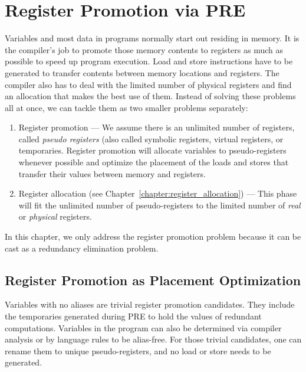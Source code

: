\section{Register Promotion via PRE}
 Variables and most data in programs normally start out residing in memory. 
It is the compiler's job to promote those memory contents to registers as much as possible to speed up program execution.
Load and store instructions have to be generated to transfer contents between memory locations and registers. 
The compiler also has to deal with the limited number of physical registers and find an allocation that makes the best use of them. 
Instead of solving these problems all at once, we can tackle them as two smaller problems separately:
\begin{enumerate}
\item Register promotion --- We assume there is an unlimited number of registers, called \emph{pseudo registers} (also called symbolic registers, virtual registers, or temporaries. 
  Register promotion will allocate variables to pseudo-registers whenever possible and optimize the placement of the loads and stores that transfer their values between memory and registers.
\item Register allocation (see Chapter~\ref{chapter:register_allocation}) --- This phase will fit the unlimited number of pseudo-registers to the limited number of \emph{real} or \emph{physical} registers.
\end{enumerate}

In this chapter, we only address the register promotion problem because it can
be cast as a redundancy elimination problem.

\subsection{Register Promotion as Placement Optimization}
Variables with no aliases are trivial register promotion candidates. 
They include the temporaries generated during PRE to hold the values of redundant computations. 
Variables in the program can also be determined via compiler analysis or by language rules to be alias-free. 
For those trivial candidates, one can rename them to unique pseudo-registers, and no load or store needs to be generated.


